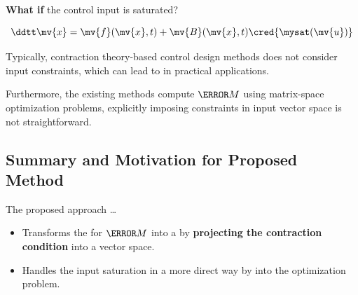 \begin{frame}{\insertsubsectionhead}{}

  \textbf{What if} the control input is saturated?

  \begin{equation}
    \ddtt\mv{x} = \mv{f}(\mv{x},t) + \mv{B}(\mv{x},t)\cred{\mysat(\mv{u})}
  \end{equation}

  Typically, contraction theory-based control design methods does not consider input constraints, which can lead to  in practical applications.

  Furthermore, the existing methods compute $\mm{M}$ using matrix-space optimization problems, explicitly imposing constraints in input vector space is not straightforward.
\end{frame}

\subsection{Summary and Motivation for Proposed Method}

\begin{frame}{\insertsubsectionhead}{}




  The proposed approach \dots

  \begin{itemize}
    \item Transforms the  for $\mm{M}$ into a  by \textbf{projecting the contraction condition} into a vector space.
    \item Handles the input saturation in a more direct way by  into the optimization problem.
  \end{itemize}
    
\end{frame}


